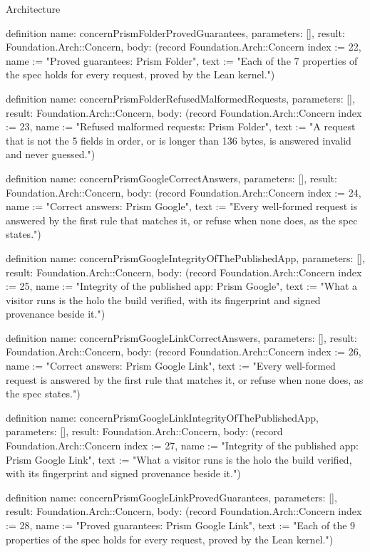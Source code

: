 \begin{lexlean}{Architecture}
\begin{semanticmodule}
definition{
  name: concernPrismFolderProvedGuarantees,
  parameters: [],
  result: Foundation.Arch::Concern,
  body: (record Foundation.Arch::Concern {index := 22, name := "Proved guarantees: Prism Folder", text := "Each of the 7 properties of the spec holds for every request, proved by the Lean kernel."})
}

definition{
  name: concernPrismFolderRefusedMalformedRequests,
  parameters: [],
  result: Foundation.Arch::Concern,
  body: (record Foundation.Arch::Concern {index := 23, name := "Refused malformed requests: Prism Folder", text := "A request that is not the 5 fields in order, or is longer than 136 bytes, is answered invalid and never guessed."})
}

definition{
  name: concernPrismGoogleCorrectAnswers,
  parameters: [],
  result: Foundation.Arch::Concern,
  body: (record Foundation.Arch::Concern {index := 24, name := "Correct answers: Prism Google", text := "Every well-formed request is answered by the first rule that matches it, or refuse when none does, as the spec states."})
}

definition{
  name: concernPrismGoogleIntegrityOfThePublishedApp,
  parameters: [],
  result: Foundation.Arch::Concern,
  body: (record Foundation.Arch::Concern {index := 25, name := "Integrity of the published app: Prism Google", text := "What a visitor runs is the holo the build verified, with its fingerprint and signed provenance beside it."})
}

definition{
  name: concernPrismGoogleLinkCorrectAnswers,
  parameters: [],
  result: Foundation.Arch::Concern,
  body: (record Foundation.Arch::Concern {index := 26, name := "Correct answers: Prism Google Link", text := "Every well-formed request is answered by the first rule that matches it, or refuse when none does, as the spec states."})
}

definition{
  name: concernPrismGoogleLinkIntegrityOfThePublishedApp,
  parameters: [],
  result: Foundation.Arch::Concern,
  body: (record Foundation.Arch::Concern {index := 27, name := "Integrity of the published app: Prism Google Link", text := "What a visitor runs is the holo the build verified, with its fingerprint and signed provenance beside it."})
}

definition{
  name: concernPrismGoogleLinkProvedGuarantees,
  parameters: [],
  result: Foundation.Arch::Concern,
  body: (record Foundation.Arch::Concern {index := 28, name := "Proved guarantees: Prism Google Link", text := "Each of the 9 properties of the spec holds for every request, proved by the Lean kernel."})
}


\end{semanticmodule}
\end{lexlean}
